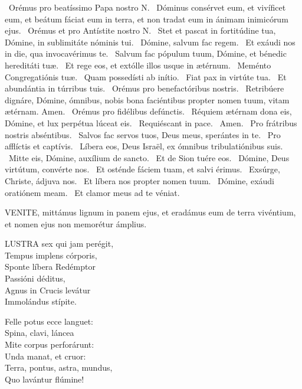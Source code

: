 \V\ Orémus pro beatíssimo Papa nostro N. \R\ Dóminus consérvet eum, et vivíficet eum, et beátum fáciat eum in terra, et non tradat eum in ánimam inimicórum ejus. \V\ Orémus et pro Antístite nostro N. \R\ Stet et pascat in fortitúdine tua, Dómine, in sublimitáte nóminis tui. \V\ Dómine, salvum fac regem. \R\ Et exáudi nos in die, qua invocavérimus te. \V\ Salvum fac pópulum tuum, Dómine, et bénedic hereditáti tuæ. \R\ Et rege eos, et extólle illos usque in ætérnum. \V\ Meménto Congregatiónis tuæ. \R\ Quam possedísti ab inítio. \V\ Fiat pax in virtúte tua. \R\ Et abundántia in túrribus tuis. \V\ Orémus pro benefactóribus nostris. \R\ Retribúere dignáre, Dómine, ómnibus, nobis bona faciéntibus propter nomen tuum, vitam ætérnam. Amen. \V\ Orémus pro fidélibus defúnctis. \R\ Réquiem ætérnam dona eis, Dómine, et lux perpétua lúceat eis. \V\ Requiéscant in pace. \R\ Amen. \V\ Pro frátribus nostris abséntibus. \R\ Salvos fac servos tuos, Deus meus, sperántes in te. \V\ Pro afflíctis et captívis. \R\ Líbera eos, Deus Israël, ex ómnibus tribulatiónibus suis. \V\ Mitte eis, Dómine, auxílium de sancto. \R\ Et de Sion tuére eos. \V\ Dómine, Deus virtútum, convérte nos. \R\ Et osténde fáciem tuam, et salvi érimus. \V\ Exsúrge, Christe, ádjuva nos. \R\ Et líbera nos propter nomen tuum. \V\ Dómine, exáudi oratiónem meam. \R\ Et clamor meus ad te véniat.




\lettrine[lines=2]{V}{ENITE}, mittámus lignum in panem ejus, et eradámus eum de terra vivéntium, et nomen ejus non memorétur ámplius.


\lettrine[lines=2]{L}{USTRA} sex qui jam perégit,\\
Tempus implens córporis,\\
Sponte líbera Redémptor\\
Passióni déditus,\\
Agnus in Crucis levátur\\
Immolándus stípite.

Felle potus ecce languet:\\
Spina, clavi, láncea\\
Mite corpus perforárunt:\\
Unda manat, et cruor:\\
Terra, pontus, astra, mundus,\\
Quo lavántur flúmine!

